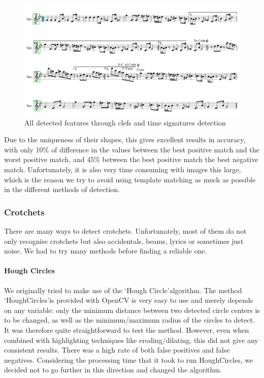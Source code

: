 \begin{figure}[h!]
	\centering
	\includegraphics[width=1\textwidth]{./assets/detectedfeatures.jpg}
	\caption{All detected features through clefs and time signatures detection}
	\label{image:detectedfeatures}
\end{figure}


Due to the uniqueness of their shapes, this gives excellent results in accuracy, with only 10\% of difference in the values between the best positive match and the worst positive match, and 45\% between the best positive match the best negative match. Unfortunately, it is also very time consuming with images this large, which is the reason we try to avoid using template matching as much as possible in the different
methods of detection.

\subsubsection{Crotchets}

There are many ways to detect crotchets. Unfortunately, most of them do not only recognise crotchets but also accidentals, beams, lyrics or sometimes just noise. We had to try many methods before finding a reliable one.

\paragraph{Hough Circles}

We originally tried to make use of the \lq Hough Circle\rq  algorithm. The method \lq HoughCircles\rq  is provided with OpenCV is very easy to use and merely depends on any variable: only the minimum distance between two detected circle centers is to be changed, as well as the minimum/maximum radius of the circles to detect. It was therefore quite straightforward to test the method. However, even when combined
with highlighting techniques like eroding/dilating, this did not give any consistent results. There was a high rate of both false positives and false negatives. Considering the processing time that it took to run HoughCircles, we decided not to go further in this direction and changed the algorithm.

